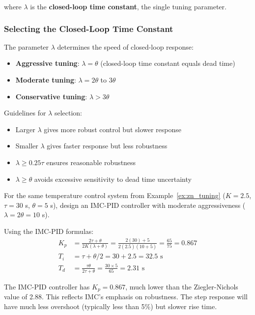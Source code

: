 where $\lambda$ is the \textbf{closed-loop time constant}, the single tuning parameter.

\subsubsection{Selecting the Closed-Loop Time Constant}

The parameter $\lambda$ determines the speed of closed-loop response:

\begin{itemize}
    \item \textbf{Aggressive tuning}: $\lambda = \theta$ (closed-loop time constant equals dead time)
    \item \textbf{Moderate tuning}: $\lambda = 2\theta$ to $3\theta$
    \item \textbf{Conservative tuning}: $\lambda > 3\theta$
\end{itemize}

Guidelines for $\lambda$ selection:
\begin{itemize}
    \item Larger $\lambda$ gives more robust control but slower response
    \item Smaller $\lambda$ gives faster response but less robustness
    \item $\lambda \geq 0.25\tau$ ensures reasonable robustness
    \item $\lambda \geq \theta$ avoids excessive sensitivity to dead time uncertainty
\end{itemize}


\begin{example}
\label{ex:imc_tuning}
For the same temperature control system from Example~\ref{ex:zn_tuning} ($K = 2.5$, $\tau = 30$ s, $\theta = 5$ s), design an IMC-PID controller with moderate aggressiveness ($\lambda = 2\theta = 10$ s).

Using the IMC-PID formulas:
\begin{align}
K_p &= \frac{2\tau + \theta}{2K(\lambda + \theta)} = \frac{2(30) + 5}{2(2.5)(10 + 5)} = \frac{65}{75} = 0.867 \\
T_i &= \tau + \theta/2 = 30 + 2.5 = 32.5 \text{ s} \\
T_d &= \frac{\tau \theta}{2\tau + \theta} = \frac{30 \times 5}{65} = 2.31 \text{ s}
\end{align}

The IMC-PID controller has $K_p = 0.867$, much lower than the Ziegler-Nichols value of 2.88. This reflects IMC's emphasis on robustness. The step response will have much less overshoot (typically less than 5\%) but slower rise time.
\end{example}


